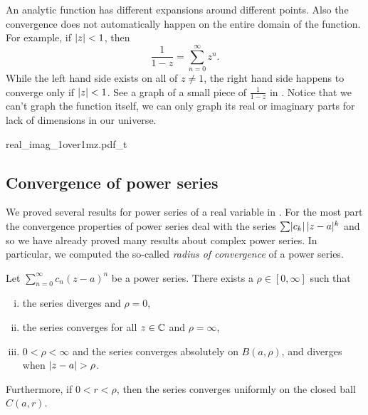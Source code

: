 An analytic function has different expansions around different
points.  Also the convergence does not automatically happen on the entire
domain of the function.  For example, if $\lvert {z} \rvert < 1$, then
\begin{equation*}
\frac{1}{1-z} = \sum_{n=0}^\infty z^n .
\end{equation*}
While the left hand side exists on all of $z \not= 1$, the right hand side
happens to converge only if $\lvert {z} \rvert < 1$.  See a graph
of a small piece of $\frac{1}{1-z}$ in .
Notice that we can't graph the
function itself, we can only graph its real or imaginary parts for lack
of dimensions in our universe.

\begin{myfigureht}
{real_imag_1over1mz.pdf_t}
\caption{Graphs of the real and imaginary parts of $z=x+iy \mapsto \frac{1}{1-z}$
in the square $[-0.8,0.8]^2$.  The singularity at $z=1$ is marked with a
vertical dashed line.\label{fig:1over1mz}}
\end{myfigureht}

\subsection{Convergence of power series}

We proved several results for power series of a real variable in
.   For the most part the convergence
properties of power series deal with the series
$\sum \lvert {c_k} \rvert \, \lvert {z-a} \rvert^k$ and so we have already proved many results about complex power
series.  In particular, we computed the so-called
\emph{radius of convergence} of a power series.

\begin{samepage}
\begin{prop}
Let $\sum_{n=0}^\infty c_n {(z-a)}^n$ be a power series.
There exists a $\rho \in [0,\infty]$ such that
\begin{enumerate}[(i)]
\item the series diverges and $\rho = 0$,
\item the series converges for all $z \in {\mathbb{C}}$ and $\rho = \infty$,
\item $0 < \rho < \infty$ and the
series converges absolutely on $B(a,\rho)$,
and diverges when $\lvert {z-a} \rvert > \rho$.
\end{enumerate}
Furthermore, if $0 < r < \rho$, then
the series converges uniformly on the closed ball $C(a,r)$.
\end{prop}
\end{samepage}

